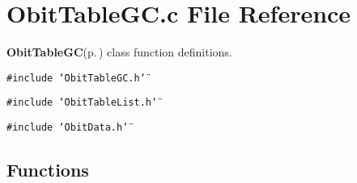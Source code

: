 \section{Obit\-Table\-GC.c File Reference}
\label{ObitTableGC_8c}
{\bf Obit\-Table\-GC}{\rm (p.\,\pageref{structObitTableGC})} class function definitions. 

{\tt \#include \char`\"{}Obit\-Table\-GC.h\char`\"{}}\par
{\tt \#include \char`\"{}Obit\-Table\-List.h\char`\"{}}\par
{\tt \#include \char`\"{}Obit\-Data.h\char`\"{}}\par
\subsection*{Functions}
